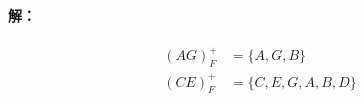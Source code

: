 \paragraph{解：}
\begin{align*}
	(AG)^{+}_{F} &= \{A, G, B\} \\
	(CE)^{+}_{F} &= \{C, E, G, A, B, D\}
\end{align*}
